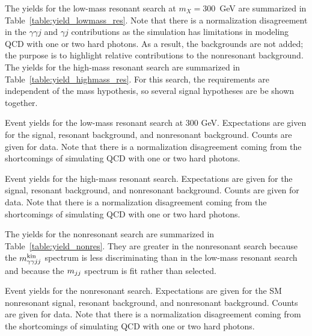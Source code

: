 The yields for the low-mass resonant search at $m_X = 300$~GeV are summarized in
Table~\ref{table:yield_lowmass_res}. Note that there is a normalization disagreement in the
$\gamma\gamma j$ and $\gamma j$ contributions as the simulation has limitations in modeling
QCD with one or two hard photons. As a result, the backgrounds are not added; the purpose is to
highlight relative contributions to the nonresonant background.
The yields for the high-mass resonant search are summarized in
Table~\ref{table:yield_highmass_res}. For this search, the requirements are independent of
the mass hypothesis, so several signal hypotheses are be shown together.

\begin{table}[ht!]
  \centering
  \renewcommand{\arraystretch}{1.4}
  \caption{Event yields for the low-mass resonant search at 300 GeV. Expectations are given for
the signal, resonant background, and nonresonant background. Counts are given for data. Note that
there is a normalization disagreement coming from the shortcomings of simulating QCD with one
or two hard photons.}
  
  \label{table:yield_lowmass_res}
\end{table}

\begin{table}[ht!]
  \centering
  \renewcommand{\arraystretch}{1.4}
  \caption{Event yields for the high-mass resonant search. Expectations are given for
the signal, resonant background, and nonresonant background. Counts are given for data. Note that
there is a normalization disagreement coming from the shortcomings of simulating QCD with one
or two hard photons.}
  
  \label{table:yield_highmass_res}
\end{table}

The yields for the nonresonant search are summarized in Table~\ref{table:yield_nonres}.
They are greater in the nonresonant search because the $m_{\gamma\gamma jj}^{\rm kin}$ spectrum is less
discriminating than in the low-mass resonant search and because the $m_{jj}$ spectrum is fit rather than
selected.

\begin{table}[ht!]
  \centering
  \renewcommand{\arraystretch}{1.4}
  \caption{Event yields for the nonresonant search. Expectations are given for
the SM nonresonant signal, resonant background, and nonresonant background.
Counts are given for data. Note that
there is a normalization disagreement coming from the shortcomings of simulating QCD with one
or two hard photons.}
  
  \label{table:yield_nonres}
\end{table}


